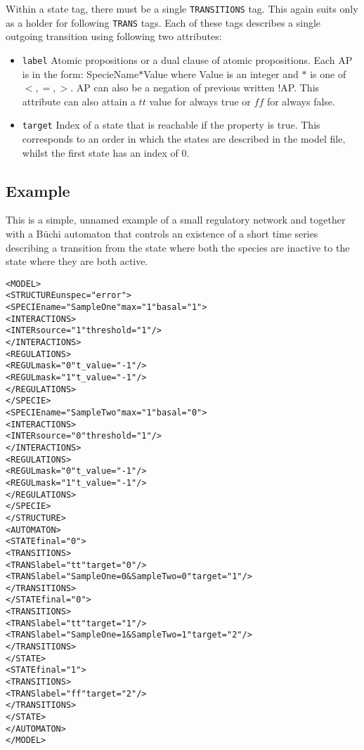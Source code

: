 \documentclass[12pt]{article}
\begin{document}
Within a state tag, there must be a single \texttt{TRANSITIONS} tag. This again suits only as a holder for following \texttt{TRANS} tags. Each of these tags describes a single outgoing transition using following two attributes:
\begin{itemize}
\item \texttt{label} Atomic propositions or a dual clause of atomic propositions. Each AP is in the form: SpecieName$*$Value where Value is an integer and $*$ is one of $<,=,>$. AP can also be a negation of previous written !AP. This attribute can also attain a $tt$ value for always true or $ff$ for always false. \\
\item \texttt{target} Index of a state that is reachable if the property is true. This corresponds to an order in which the states are described in the model file, whilst the first state has an index of $0$.
\end{itemize}
\subsection{Example}
This is a simple, unnamed example of a small regulatory network and together with a B\"uchi automaton that controls an existence of a short time series describing a transition from the state where both the species are inactive to the state where they are both active.
\begin{alltt}
<MODEL>
   <STRUCTURE unspec="error">
      <SPECIE name="SampleOne" max="1" basal="1">
         <INTERACTIONS>
            <INTER source="1" threshold ="1" />
         </INTERACTIONS>
         <REGULATIONS>
            <REGUL mask="0" t_value="-1" />
            <REGUL mask="1" t_value="-1" />
         </REGULATIONS>
      </SPECIE>
      <SPECIE name="SampleTwo" max="1" basal="0">
         <INTERACTIONS>
            <INTER source="0" threshold ="1" />
         </INTERACTIONS>
         <REGULATIONS>
            <REGUL mask="0" t_value="-1" />
            <REGUL mask="1" t_value="-1" />
         </REGULATIONS>
      </SPECIE>
   </STRUCTURE>
   <AUTOMATON>
      <STATE final="0">
         <TRANSITIONS>
            <TRANS label="tt" target="0" />
            <TRANS label="SampleOne=0&SampleTwo=0" target="1" />
         </TRANSITIONS>
      </STATE final="0">
         <TRANSITIONS>
            <TRANS label="tt" target="1" />
            <TRANS label="SampleOne=1&SampleTwo=1" target="2" />
         </TRANSITIONS>
      </STATE>
      <STATE final="1">
         <TRANSITIONS>
            <TRANS label="ff" target="2" />
         </TRANSITIONS>
      </STATE>
   </AUTOMATON>
</MODEL>
\end{alltt}
\end{document}
